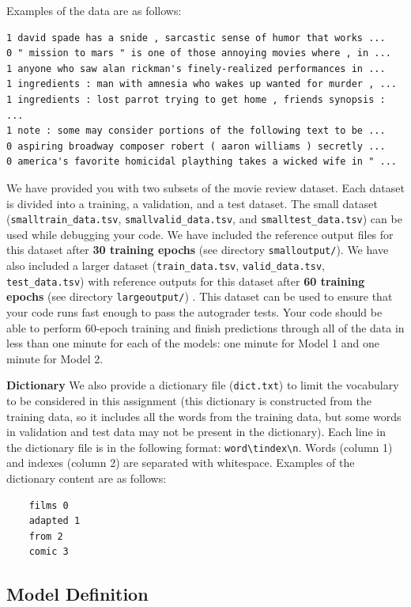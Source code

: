 \documentclass[11pt]{article}
\numberwithin{equation}{section} %
\numberwithin{figure}{section} %
\numberwithin{table}{section} %
\begin{document}
Examples of the data are as follows:
 
\begin{lstlisting}
1 david spade has a snide , sarcastic sense of humor that works ... 
0 " mission to mars " is one of those annoying movies where , in ...
1 anyone who saw alan rickman's finely-realized performances in ...
1 ingredients : man with amnesia who wakes up wanted for murder , ...
1 ingredients : lost parrot trying to get home , friends synopsis : ... 
1 note : some may consider portions of the following text to be ...
0 aspiring broadway composer robert ( aaron williams ) secretly ...
0 america's favorite homicidal plaything takes a wicked wife in " ...
\end{lstlisting}

We have provided you with two subsets of the movie review dataset. Each dataset is divided into a training, a validation, and a test dataset.
%
The small dataset (\lstinline{smalltrain_data.tsv}, \lstinline{smallvalid_data.tsv}, and \lstinline{smalltest_data.tsv}) can be used while debugging your code. We have included the reference output files for this dataset after \textbf{30 training epochs} (see directory \lstinline{smalloutput/}). 
%
We have also included a larger dataset (\lstinline{train_data.tsv}, \lstinline{valid_data.tsv}, \lstinline{test_data.tsv}) with reference outputs for this dataset after \textbf{60 training epochs}  (see directory \lstinline{largeoutput/}) . This dataset can be used to ensure that your code runs fast enough to pass the autograder tests. Your code should be able to perform 60-epoch training and finish  predictions through all of the data in less than one minute for each of the models: one minute for Model 1 and one minute for Model 2.

  {\bf Dictionary } We also provide a dictionary file (\lstinline{dict.txt}) to limit the vocabulary to be considered in this assignment (this dictionary is constructed from the training data, so it includes all the words from the training data, but some words in validation and test data may not be present in the dictionary). Each line in the dictionary file is in the following format: \lstinline{word\tindex\n}. Words (column 1) and indexes (column 2) are separated with whitespace. Examples of the dictionary content are as follows: 
    \begin{lstlisting}
    films 0
    adapted 1
    from 2
    comic 3
    \end{lstlisting}
 
\subsection{Model Definition}\label{modeldescript}
 
\end{document}
